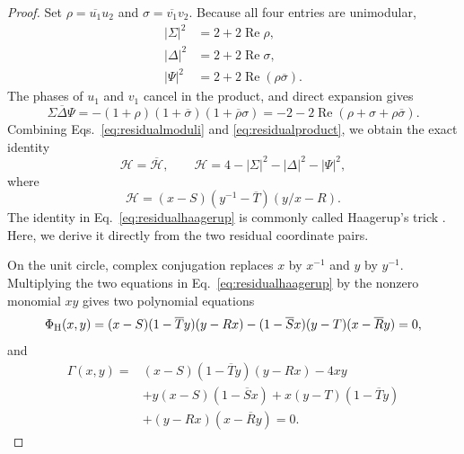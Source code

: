 \documentclass[aps,prx,reprint,nofootinbib,twoside,superscriptaddress,longbibliography,floatfix]{revtex4-2}
\theoremstyle{definition}
\newcommand{\RePart}{\operatorname{Re}}
\begin{document}
\begin{proof}
Set $\rho=\overline{u_1}u_2$ and $\sigma=\overline{v_1}v_2$.  Because all four entries are unimodular,
\begin{equation}
\begin{aligned}
|\Sigma|^2&=2+2\RePart\rho,\\
|\Delta|^2&=2+2\RePart\sigma,\\
|\Psi|^2&=2+2\RePart(\rho\overline\sigma).
\end{aligned}
\label{eq:residualmoduli}
\end{equation}
The phases of $u_1$ and $v_1$ cancel in the product, and direct expansion gives
\begin{equation}
\Sigma\overline\Delta\Psi
=-(1+\rho)(1+\overline\sigma)(1+\overline\rho\sigma)
=-2-2\RePart(\rho+\sigma+\rho\overline\sigma).
\label{eq:residualproduct}
\end{equation}
Combining Eqs.~\eqref{eq:residualmoduli} and \eqref{eq:residualproduct}, we obtain the exact identity
\begin{equation}
\mathcal H=\overline{\mathcal H},
\qquad
\mathcal H=4-|\Sigma|^2-|\Delta|^2-|\Psi|^2,
\label{eq:residualhaagerup}
\end{equation}
where
\begin{equation}
\mathcal H=(x-S)(y^{-1}-\overline T)(y/x-R).
\label{eq:Hcal}
\end{equation}
The identity in Eq.~\eqref{eq:residualhaagerup} is commonly called Haagerup's trick \MainCiteHaagerupSzollosi. Here, we derive it directly from the two residual coordinate pairs.

On the unit circle, complex conjugation replaces $x$ by $x^{-1}$ and $y$ by $y^{-1}$.  Multiplying the two equations in Eq.~\eqref{eq:residualhaagerup} by the nonzero monomial $xy$ gives two polynomial equations
\begin{equation}
\Phi_{\rm H}(x,y)=(x-S)(1-\overline T y)(y-Rx)
-(1-\overline Sx)(y-T)(x-\overline R y)=0,
\label{eq:Phi}
\end{equation}
and
\begin{equation}
\begin{aligned}
\Gamma(x,y)={}&(x-S)(1-\overline T y)(y-Rx)-4xy\\
&+y(x-S)(1-\overline Sx)
+x(y-T)(1-\overline T y)\\
&+(y-Rx)(x-\overline R y)=0.
\end{aligned}
\label{eq:Gamma}
\end{equation}


\end{proof}
\end{document}
